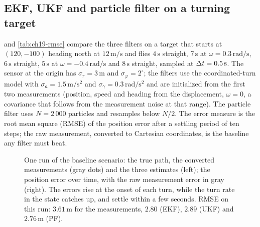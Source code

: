 \subsection{EKF, UKF and particle filter on a turning target}
\label{sec:ch19-ukf-compare}

 and \cref{tab:ch19-rmse} compare the three filters
on a target that starts at $(120, -100)$ heading north at $12\,\mathrm{m/s}$
and flies $4\,\mathrm{s}$ straight, $7\,\mathrm{s}$ at $\omega =
0.3\,\mathrm{rad/s}$, $6\,\mathrm{s}$ straight, $5\,\mathrm{s}$ at $\omega =
-0.4\,\mathrm{rad/s}$ and $8\,\mathrm{s}$ straight, sampled at $\Delta t =
0.5\,\mathrm{s}$. The sensor at the origin has $\sigma_r = 3\,\mathrm{m}$
and $\sigma_\varphi = 2^\circ$; the filters use the coordinated-turn model
with $\sigma_a = 1.5\,\mathrm{m/s^2}$ and $\sigma_\gamma =
0.3\,\mathrm{rad/s^2}$ and are initialized from the first two measurements
(position, speed and heading from the displacement, $\omega = 0$, a
covariance that follows from the measurement noise at that range). The
particle filter uses $N = 2\,000$ particles and resamples below $N/2$.
The error measure is the root mean square (RMSE) of the position error
after a settling period of ten steps; the raw measurement, converted to
Cartesian coordinates, is the baseline any filter must beat.

\begin{figure}[tb]
  \centering
  \caption{One run of the baseline scenario: the true path, the converted
  measurements (gray dots) and the three estimates (left); the position
  error over time, with the raw measurement error in gray (right). The
  errors rise at the onset of each turn, while the turn rate in the state
  catches up, and settle within a few seconds. RMSE on this run:
  $3.61\,\mathrm{m}$ for the measurements, $2.80$ (EKF), $2.89$ (UKF) and
  $2.76\,\mathrm{m}$ (PF).}
  \label{fig:ch19-compare}
\end{figure}

